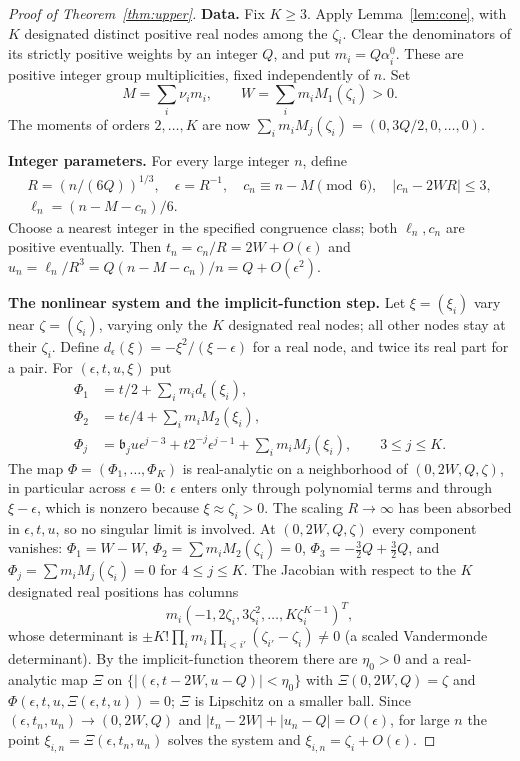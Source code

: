 \documentclass[11pt]{article}
\theoremstyle{remark}\newtheorem{remark}[theorem]{Remark}
\begin{document}
\begin{proof}[Proof of Theorem~\ref{thm:upper}]
\textbf{Data.}
Fix \(K\ge3\). Apply Lemma~\ref{lem:cone}, with \(K\) designated
distinct positive real nodes among the \(\zeta_i\). Clear the
denominators of its strictly positive weights by an integer \(Q\),
and put \(m_i=Q\alpha_i^0\). These are positive integer group
multiplicities, fixed independently of \(n\). Set
\[
 M=\sum_i\nu_i m_i,\qquad W=\sum_i m_i M_1(\zeta_i)>0.
\]
The moments of orders \(2,\ldots,K\) are now
\(\sum_im_iM_j(\zeta_i)=(0,3Q/2,0,\ldots,0)\).

\textbf{Integer parameters.}
For every large integer \(n\), define
\begin{gather*}
 R=(n/(6Q))^{1/3},\quad \epsilon=R^{-1},\quad
 c_n\equiv n-M\pmod6,\quad |c_n-2WR|\le3,\\
 \ell_n=(n-M-c_n)/6 .
\end{gather*}
Choose a nearest integer in the specified congruence class; both
\(\ell_n,c_n\) are positive eventually. Then
\(t_n=c_n/R=2W+O(\epsilon)\) and
\(u_n=\ell_n/R^3=Q(n-M-c_n)/n=Q+O(\epsilon^2)\).

\textbf{The nonlinear system and the implicit-function step.}
Let \(\xi=(\xi_i)\) vary near \(\zeta=(\zeta_i)\), varying only the \(K\)
designated real nodes; all other nodes stay at their \(\zeta_i\).
Define \(d_\epsilon(\xi)=-\xi^2/(\xi-\epsilon)\) for a real node,
and twice its real part for a pair. For \((\epsilon,t,u,\xi)\) put
\begin{align}
 \Phi_1&=t/2+\sum_i m_i d_\epsilon(\xi_i),\label{eq:defect-slope}\\
 \Phi_2&=t\epsilon/4+\sum_i m_i M_2(\xi_i),\label{eq:defect-two}\\
 \Phi_j&=\mathfrak b_j u\epsilon^{j-3}+t2^{-j}\epsilon^{j-1}
       +\sum_i m_i M_j(\xi_i),\qquad 3\le j\le K.
       \label{eq:defect-high}
\end{align}
The map \(\Phi=(\Phi_1,\ldots,\Phi_K)\) is real-analytic on a
neighborhood of \((0,2W,Q,\zeta)\), in particular across \(\epsilon=0\):
\(\epsilon\) enters only through polynomial terms and through
\(\xi-\epsilon\), which is nonzero because \(\xi\approx\zeta_i>0\).
The scaling \(R\to\infty\) has been absorbed in \(\epsilon,t,u\), so no
singular limit is involved. At \((0,2W,Q,\zeta)\) every component vanishes:
\(\Phi_1=W-W\), \(\Phi_2=\sum m_iM_2(\zeta_i)=0\),
\(\Phi_3=-\tfrac32Q+\tfrac32Q\), and \(\Phi_j=\sum m_iM_j(\zeta_i)=0\)
for \(4\le j\le K\). The Jacobian with respect to the \(K\) designated
real positions has columns
\[
 m_i(-1,2\zeta_i,3\zeta_i^2,\ldots,K\zeta_i^{K-1})^T,
\]
whose determinant is \(\pm K!\prod_im_i\prod_{i<i'}(\zeta_{i'}-\zeta_i)\ne0\)
(a scaled Vandermonde determinant). By the implicit-function theorem there
are \(\eta_0>0\) and a real-analytic map \(\Xi\) on
\(\{|(\epsilon,t-2W,u-Q)|<\eta_0\}\) with \(\Xi(0,2W,Q)=\zeta\) and
\(\Phi(\epsilon,t,u,\Xi(\epsilon,t,u))=0\); \(\Xi\) is Lipschitz on a
smaller ball. Since \((\epsilon,t_n,u_n)\to(0,2W,Q)\) and
\(|t_n-2W|+|u_n-Q|=O(\epsilon)\), for large \(n\) the point
\(\xi_{i,n}=\Xi(\epsilon,t_n,u_n)\) solves the system and
\(\xi_{i,n}=\zeta_i+O(\epsilon)\).


\end{proof}
\end{document}
